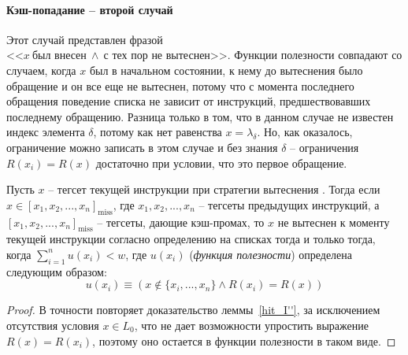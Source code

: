 \paragraph{Кэш-попадание -- второй случай} Этот случай представлен
фразой\\ <<$x~\mbox{был внесен}~\wedge~\mbox{с тех пор не
вытеснен}$>>. Функции полезности совпадают со случаем, когда $x$ был
в начальном состоянии, к нему до вытеснения было обращение и он все
еще не вытеснен, потому что с момента последнего обращения поведение
списка \LRU не зависит от инструкций, предшествовавших последнему
обращению. Разница только в том, что в данном случае не известен
индекс элемента $\delta$, потому как нет равенства $x =
\lambda_\delta$. Но, как оказалось, ограничение можно записать в
этом случае и без знания $\delta$ -- ограничения $R(x_i) = R(x)$
достаточно при условии, что это первое обращение.

\begin{lemma}\label{hit_II} Пусть $x$ -- тегсет текущей
инструкции при стратегии вытеснения \LRU. Тогда если $x \in [x_1,
x_2, ..., x_n]_{\mbox{miss}}$, где $x_1, x_2, ..., x_n$ -- тегсеты
предыдущих инструкций, а $[x_1, x_2, ..., x_n]_{\mbox{miss}}$ --
тегсеты, дающие кэш-промах, то $x$ не вытеснен к моменту текущей
инструкции согласно определению \LRU на списках тогда и только
тогда, когда $\sum^n_{i=1} u(x_i) < w$, где $u(x_i)$ (\emph{функция
полезности}) определена следующим образом:
$$u(x_i) \equiv (x \notin \{x_i, ..., x_n\} \wedge R(x_i) = R(x))$$

\end{lemma}
\begin{proof}
  В точности повторяет доказательство леммы~\ref{hit_I''}, за
  исключением отсутствия условия $x \in L_0$, что не дает
  возможности упростить выражение $R(x) = R(x_i)$, поэтому оно
  остается в функции полезности в таком виде.
\end{proof}



